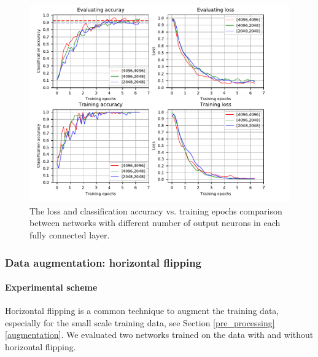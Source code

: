 \begin{figure}
	\includegraphics[trim=0cm 0cm 0cm 0cm]{fig01/plot_noo.pdf}
	\caption{The loss and classification accuracy vs. training epochs comparison between networks with different number of output neurons in each fully connected layer.}
	\label{fig:plot_noo}
\end{figure}


\subsubsection{Data augmentation: horizontal flipping}
\paragraph{Experimental scheme}
Horizontal flipping is a common technique to augment the training data, especially for the small scale training data, see Section \ref{pre_processing} \ref{augmentation}. We evaluated two networks trained on the data with and without horizontal flipping. 

